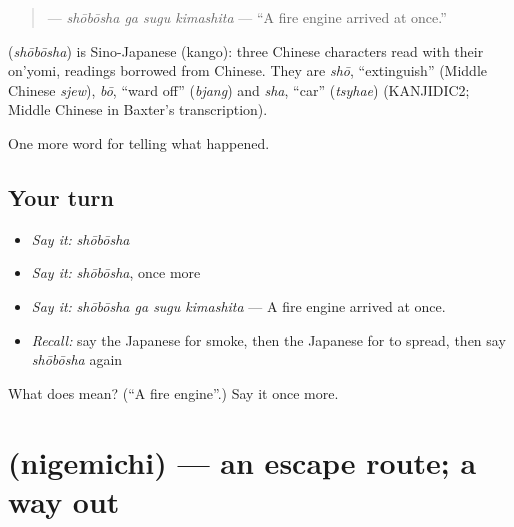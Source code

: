 \begin{quote}
\textbf{  } — \emph{shōbōsha ga sugu kimashita} — \textquotedblleft{}A fire engine arrived at once.\textquotedblright{}
\end{quote}

\begin{cousinweb}
\textbf{} (\emph{shōbōsha}) is Sino-Japanese (kango): three Chinese characters read with their on'yomi, readings borrowed from Chinese. They are \emph{shō}, \textquotedblleft{}extinguish\textquotedblright{} (Middle Chinese \emph{sjew}), \emph{bō}, \textquotedblleft{}ward off\textquotedblright{} (\emph{bjang}) and \emph{sha}, \textquotedblleft{}car\textquotedblright{} (\emph{tsyhae}) (KANJIDIC2; Middle Chinese in Baxter's transcription).
\end{cousinweb}

\begin{grammarlens}[title={What you've built}]
One more word for telling what happened.
\end{grammarlens}

\subsection*{Your turn}
\begin{itemize}
\raggedright
  \item \emph{Say it:} \emph{shōbōsha}
  \item \emph{Say it:} \emph{shōbōsha}, once more
  \item \emph{Say it:} \emph{shōbōsha ga sugu kimashita} — A fire engine arrived at once.
  \item \emph{Recall:} say the Japanese for smoke, then the Japanese for to spread, then say \emph{shōbōsha} again
\end{itemize}

\begin{tcolorbox}[breakable,colback=teal!4,colframe=teal!35!black,title={Before you move on}]
What does  mean? (\textquotedblleft{}A fire engine\textquotedblright{}.) Say it once more.
\end{tcolorbox}
\section[\texorpdfstring{\ja{にげみち} (nigemichi)}{にげみち (nigemichi)}]{ (nigemichi) — an escape route; a way out}

\label{lesson:JA-C265-nigemichi}



